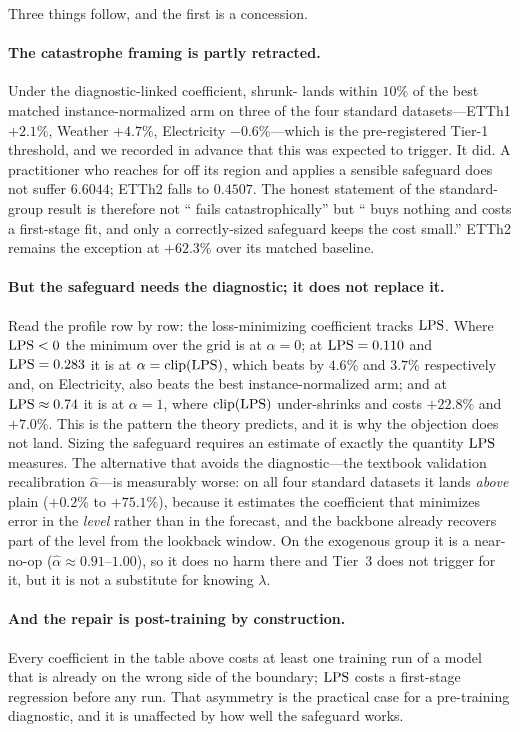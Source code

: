\noindent Three things follow, and the first is a concession.

\paragraph{The catastrophe framing is partly retracted.} Under the diagnostic-linked coefficient, shrunk-\cnm{} lands within $10\%$ of the best matched instance-normalized arm on three of the four standard datasets---ETTh1 $+2.1\%$, Weather $+4.7\%$, Electricity $-0.6\%$---which is the pre-registered Tier-1 threshold, and we recorded in advance that this was expected to trigger. It did. A practitioner who reaches for \cnm{} off its region and applies a sensible safeguard does not suffer $6.6044$; ETTh2 falls to $0.4507$. The honest statement of the standard-group result is therefore not ``\cnm{} fails catastrophically'' but ``\cnm{} buys nothing and costs a first-stage fit, and only a correctly-sized safeguard keeps the cost small.'' ETTh2 remains the exception at $+62.3\%$ over its matched baseline.

\paragraph{But the safeguard needs the diagnostic; it does not replace it.} Read the profile row by row: the loss-minimizing coefficient tracks $\mathrm{LPS}$. Where $\mathrm{LPS}<0$ the minimum over the grid is at $\alpha=0$; at $\mathrm{LPS}=0.110$ and $\mathrm{LPS}=0.283$ it is at $\alpha=\mathrm{clip}(\mathrm{LPS})$, which beats \rawm{} by $4.6\%$ and $3.7\%$ respectively and, on Electricity, also beats the best instance-normalized arm; and at $\mathrm{LPS}\approx 0.74$ it is at $\alpha=1$, where $\mathrm{clip}(\mathrm{LPS})$ under-shrinks and costs $+22.8\%$ and $+7.0\%$. This is the pattern the theory predicts, and it is why the objection does not land. Sizing the safeguard requires an estimate of exactly the quantity $\mathrm{LPS}$ measures. The alternative that avoids the diagnostic---the textbook validation recalibration $\hat\alpha$---is measurably worse: on all four standard datasets it lands \emph{above} plain \rawm{} ($+0.2\%$ to $+75.1\%$), because it estimates the coefficient that minimizes error in the \emph{level} rather than in the forecast, and the backbone already recovers part of the level from the lookback window. On the exogenous group it is a near-no-op ($\hat\alpha \approx 0.91$--$1.00$), so it does no harm there and Tier~3 does not trigger for it, but it is not a substitute for knowing $\lambda$.

\paragraph{And the repair is post-training by construction.} Every coefficient in the table above costs at least one training run of a model that is already on the wrong side of the boundary; $\mathrm{LPS}$ costs a first-stage regression before any run. That asymmetry is the practical case for a pre-training diagnostic, and it is unaffected by how well the safeguard works.

